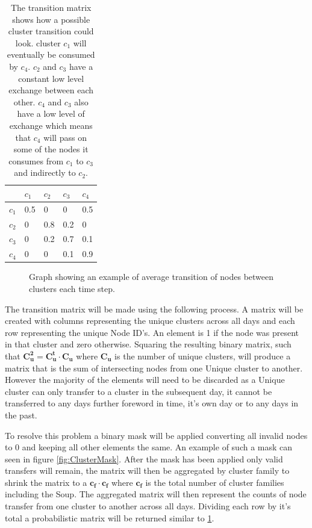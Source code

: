 \begin{table}[ht]
\centering
\begin{tabular}{|l|llll|} \hline
   & $c_1$  & $c_2$  & $c_3$  & $c_4$  \\ \hline
$c_1$ & 0.5 & 0   & 0   & 0.5 \\
$c_2$ & 0   & 0.8 & 0.2 & 0   \\
$c_3$ & 0   & 0.2 & 0.7 & 0.1   \\
$c_4$ & 0   & 0   & 0.1   & 0.9  \\ \hline
\end{tabular}
\caption[Example Cluster Transition matrix]{The transition matrix shows how a possible cluster transition could look. cluster $c_1$ will eventually be consumed by $c_4$. $c_2$ and $c_3$ have a constant low level exchange between each other. $c_4$ and $c_3$ also have a low level of exchange which means that $c_4$ will pass on some of the nodes it consumes from $c_1$ to $c_3$ and indirectly to $c_2$.}
\label{tab:trans}

\end{table}


\begin{figure}[ht]
\centering
  
  \caption[Example cluster transition graph]{Graph showing an example of average transition of nodes between clusters each time step.}
  \label{fig:exampletrans}
\end{figure}

The transition matrix will be made using the following process. A matrix will be created with columns representing the unique clusters across all days and each row representing the unique Node ID's. An element is 1 if the node was present in that cluster and zero otherwise. Squaring the resulting binary matrix, such that $\mathbf{C_u^2}=\mathbf{C_u^t} \cdot \mathbf{C_u}$ where $\mathbf{C_u}$  is the number of unique clusters, will produce a matrix that is the sum of intersecting nodes from one Unique cluster to another. However the majority of the elements will need to be discarded as a Unique cluster can only transfer to a cluster in the subsequent day, it cannot be transferred to any days further foreword in time, it's own day or to any days in the past.

To resolve this problem a binary mask will be applied converting all invalid nodes to 0 and keeping all other elements the same. An example of such a mask can seen in figure \ref{fig:ClusterMask}. After the mask has been applied only valid transfers will remain, the matrix will then be aggregated by cluster family to shrink the matrix to a $\mathbf{c_f} \cdot \mathbf{c_f}$ where $\mathbf{c_f}$ is the total number of cluster families including the Soup. The aggregated matrix will then represent the counts of node transfer from one cluster to another across all days. Dividing each row by it's total a probabilistic matrix will be returned similar to \ref{tab:trans}.

